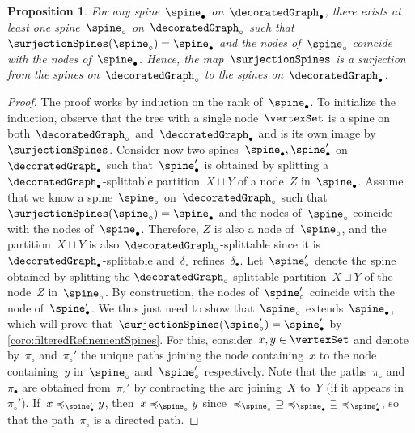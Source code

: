 \documentclass{amsart}
\newtheorem{proposition}[theorem]{Proposition}
\theoremstyle{definition}
\newcommand{\decoration}{\delta}
\begin{document}
\begin{proposition}
  \label{prop:refinementSpines}
  For any spine~$\spine_\bullet$ on~$\decoratedGraph_\bullet$, there exists at least one spine~$\spine_\circ$ on~$\decoratedGraph_\circ$ such that ${\surjectionSpines(\spine_\circ) = \spine_\bullet}$ and the nodes of~$\spine_\circ$ coincide with the nodes of~$\spine_\bullet$.
  Hence, the map~$\surjectionSpines$ is a surjection from the spines on~$\decoratedGraph_\circ$ to the spines on~$\decoratedGraph_\bullet$.
\end{proposition}

\begin{proof}
  The proof works by induction on the rank of~$\spine_\bullet$.
  To initialize the induction, observe that the tree with a single node~$\vertexSet$ is a spine on both~$\decoratedGraph_\circ$ and~$\decoratedGraph_\bullet$ and is its own image by~$\surjectionSpines$.
  Consider now two spines~$\spine_\bullet, \spine_\bullet'$ on~$\decoratedGraph_\bullet$ such that~$\spine_\bullet'$ is obtained by splitting a $\decoratedGraph_\bullet$-splittable partition~$X \sqcup Y$ of a node~$Z$ in~$\spine_\bullet$.
  Assume that we know a spine~$\spine_\circ$ on~$\decoratedGraph_\circ$ such that~${\surjectionSpines(\spine_\circ) = \spine_\bullet}$ and the nodes of~$\spine_\circ$ coincide with the nodes of~$\spine_\bullet$.
  Therefore, $Z$ is also a node of~$\spine_\circ$, and the partition~$X \sqcup Y$ is also~$\decoratedGraph_\circ$-splittable since it is $\decoratedGraph_\bullet$-splittable and~$\decoration_\circ$ refines~$\decoration_\bullet$.
  Let~$\spine_\circ'$ denote the spine obtained by splitting the  $\decoratedGraph_\circ$-splittable partition~$X \sqcup Y$ of the node~$Z$ in~$\spine_\circ$.
  By construction, the nodes of~$\spine_\circ'$ coincide with the node of~$\spine_\bullet'$.
  We thus just need to show that~$\spine_\circ$ extends~$\spine_\bullet$, which will prove that~${\surjectionSpines(\spine_\circ') = \spine_\bullet'}$ by \cref{coro:filteredRefinementSpines}.
  For this, consider~$x,y \in \vertexSet$ and denote by~$\pi_\circ$ and~$\pi_\circ'$ the unique paths joining the node containing~$x$ to the node containing~$y$ in~$\spine_\circ$ and~$\spine_\circ'$ respectively.
  Note that the paths~$\pi_\circ$ and~$\pi_\bullet$ are obtained from~$\pi_\circ'$ by contracting the arc joining~$X$ to~$Y$ (if it appears in~$\pi_\circ'$).
  If~$x \preccurlyeq_{\spine_\bullet'} y$, then~$x \preccurlyeq_{\spine_\circ} y$ since~${\preccurlyeq_{\spine_\circ}} \supseteq {\preccurlyeq_{\spine_\bullet}} \supseteq {\preccurlyeq_{\spine_\bullet'}}$, so that the path~$\pi_\circ$ is a directed path.

\end{proof}
\end{document}
